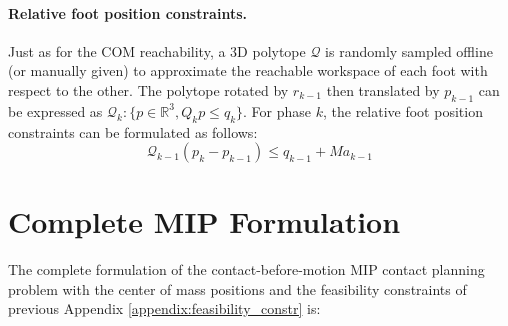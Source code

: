 \paragraph{Relative foot position constraints.\label{appendix:foot_pos_constr}}
Just as for the COM reachability, a 3D polytope $\mathcal{Q}$ is randomly sampled offline (or manually given) to approximate the reachable workspace of each foot with respect to the other. The polytope rotated by $r_{k-1}$ then translated by $p_{k-1}$ can be expressed as $\mathcal{Q}_k: \{ p \in \mathbb{R}^3, Q_k p \leq q_k \}$.
For phase $k$, the relative foot position constraints can be formulated as follows:
\begin{equation}
    \mathcal{Q}_{k-1} (p_k - p_{k-1}) \leq q_{k-1} + M a_{k-1}
\end{equation}

\section{Complete MIP Formulation \label{appendix:complete_mip_formulation}}
The complete formulation of the contact-before-motion MIP contact planning problem with the center of mass positions and the feasibility constraints of previous Appendix \ref{appendix:feasibility_constr} is:

